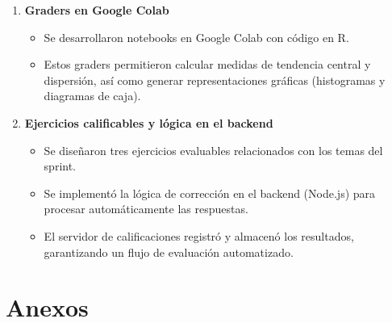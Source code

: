 \documentclass[letter,oneside,12pt,spanish]{report}
\begin{document}
\begin{enumerate}
    \item \textbf{Graders en Google Colab}
\begin{itemize}
	\item Se desarrollaron notebooks en Google Colab con código en R.
	\item Estos graders permitieron calcular medidas de tendencia central y dispersión, así como generar representaciones gráficas (histogramas y diagramas de caja).
\end{itemize}

\item \textbf{Ejercicios calificables y lógica en el backend}
\begin{itemize}
	\item Se diseñaron tres ejercicios evaluables relacionados con los temas del sprint.
	\item Se implementó la lógica de corrección en el backend (Node.js) para procesar automáticamente las respuestas.
	\item El servidor de calificaciones registró y almacenó los resultados, garantizando un flujo de evaluación automatizado.
\end{itemize}
\end{enumerate}

\newpage


%
%

\printbibliography

\nocite{poniszewska-maranda, burns-kubernetes, torres-bosch-microservicios, armstrong2015,kubevirtio, docker2023, kubelet-doc, namespace-article}
\newpage

\appendix

\chapter*{Anexos}

\renewcommand{\thechapter}{\arabic{chapter}}

\end{document}
